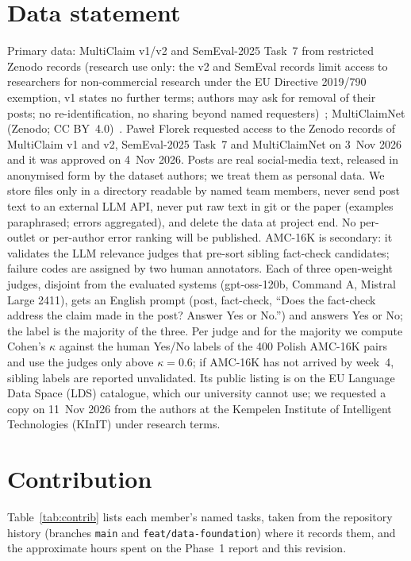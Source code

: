 \documentclass[11pt]{article}
\begin{document}
\section{Data statement}
\label{sec:datastmt}
Primary data: MultiClaim v1/v2 and SemEval-2025 Task~7 from restricted Zenodo records (research use only: the v2 and SemEval records limit access to researchers for non-commercial research under the EU Directive 2019/790 exemption, v1 states no further terms; authors may ask for removal of their posts; no re-identification, no sharing beyond named requesters)~\cite{moro2025multiclaim,pikuliak2023multilingual,peng2025semeval}; MultiClaimNet (Zenodo; CC BY~4.0)~\cite{panchendrarajan2025multiclaimnet}.
Pawe{\l} Florek requested access to the Zenodo records of MultiClaim v1 and v2, SemEval-2025 Task~7 and MultiClaimNet on 3~Nov 2026 and it was approved on 4~Nov 2026.
Posts are real social-media text, released in anonymised form by the dataset authors; we treat them as personal data.
We store files only in a directory readable by named team members, never send post text to an external LLM API, never put raw text in git or the paper (examples paraphrased; errors aggregated), and delete the data at project end.
No per-outlet or per-author error ranking will be published.
AMC-16K is secondary: it validates the LLM relevance judges that pre-sort sibling fact-check candidates; failure codes are assigned by two human annotators.
Each of three open-weight judges, disjoint from the evaluated systems (gpt-oss-120b, Command A, Mistral Large 2411), gets an English prompt (post, fact-check, ``Does the fact-check address the claim made in the post? Answer Yes or No.'') and answers Yes or No; the label is the majority of the three.
Per judge and for the majority we compute Cohen's $\kappa$ against the human Yes/No labels of the 400 Polish AMC-16K pairs and use the judges only above $\kappa=0.6$; if AMC-16K has not arrived by week~4, sibling labels are reported unvalidated.
Its public listing is on the EU Language Data Space (LDS) catalogue, which our university cannot use; we requested a copy on 11~Nov 2026 from the authors at the Kempelen Institute of Intelligent Technologies (KInIT) under research terms.


\section{Contribution}
\label{sec:contrib}
Table~\ref{tab:contrib} lists each member's named tasks, taken from the repository history (branches \texttt{main} and \texttt{feat/data-foundation}) where it records them, and the approximate hours spent on the Phase~1 report and this revision.
\end{document}
